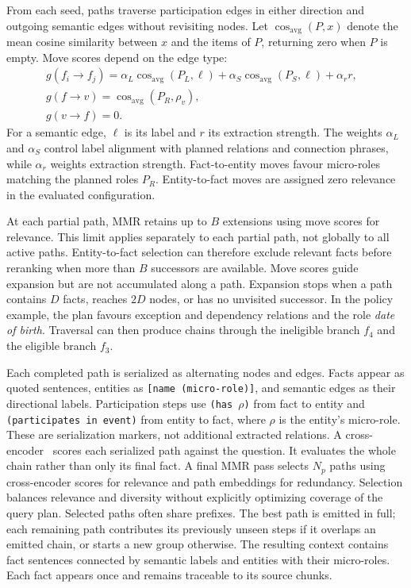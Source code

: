 \documentclass[sigconf, review, anonymous]{acmart}
\newcommand{\simcos}{\operatorname{cos}}
\begin{document}
From each seed, paths traverse participation edges in either
direction and outgoing semantic edges without revisiting nodes.
Let $\simcos_{\mathrm{avg}}(P,x)$ denote the mean cosine
similarity between $x$ and the items of $P$, returning zero
when $P$ is empty. Move scores depend on the edge type:
\begin{align*}
&g(f_i\!\rightarrow\!f_j)=
\alpha_L\simcos_{\mathrm{avg}}(P_L,\ell)+\alpha_S\simcos_{\mathrm{avg}}(P_S,\ell)
+\alpha_r r, &&\\
&g(f\!\rightarrow\!v)=
\simcos_{\mathrm{avg}}(P_R,\rho_v), &&\\
&g(v\!\rightarrow\!f)=0. &&
\end{align*}
For a semantic edge, $\ell$ is its label and $r$ its extraction
strength. The weights $\alpha_L$ and $\alpha_S$ control label
alignment with planned relations and connection phrases,
while $\alpha_r$ weights extraction strength. Fact-to-entity
moves favour micro-roles matching the planned roles $P_R$.
Entity-to-fact moves are assigned zero relevance in the
evaluated configuration.

At each partial path, MMR retains up to $B$ extensions using
move scores for relevance. This limit applies separately to
each partial path, not globally to all active paths.
Entity-to-fact selection can therefore exclude relevant facts
before reranking when more than $B$ successors are available.
Move scores guide expansion but are not accumulated along a
path. Expansion stops when a path contains $D$ facts, reaches
$2D$ nodes, or has no unvisited successor. In the policy example, the plan favours exception and dependency
relations and the role \emph{date of birth}. Traversal can then
produce chains through the ineligible branch $f_4$ and the
eligible branch $f_3$.


Each completed path is serialized as alternating nodes and
edges. Facts appear as quoted sentences, entities as
\texttt{[name (micro-role)]}, and semantic edges as their
directional labels. Participation steps use
\texttt{(has $\rho$)} from fact to entity and
\texttt{(participates in event)} from entity to fact, where
$\rho$ is the entity's micro-role. These are serialization
markers, not additional extracted relations. A cross-encoder~\cite{nogueira2019passage} scores each
serialized path against the question. It evaluates the
whole chain rather than only its final fact. A final MMR
pass selects $N_p$ paths using cross-encoder scores for
relevance and path embeddings for redundancy. Selection
balances relevance and diversity without explicitly
optimizing coverage of the query plan. Selected paths often share prefixes. The best path is
emitted in full; each remaining path contributes its
previously unseen steps if it overlaps an emitted chain,
or starts a new group otherwise. The resulting context
contains fact sentences connected by semantic labels
and entities with their micro-roles. Each fact appears
once and remains traceable to its source chunks.
\end{document}
